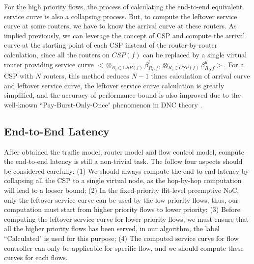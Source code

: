 \documentclass[10pt,journal]{IEEEtran}
\begin{document}
For the high priority flows, the process of calculating the end-to-end equivalent service curve is also a collapsing process. But, to compute the leftover service curve at some routers, we have to know the arrival curve at these routers. As implied previously, we can leverage the concept of CSP and compute the arrival curve at the starting point of each CSP instead of the router-by-router calculation, since all the routers on $CSP(f)$ can be replaced by a single virtual router providing service curve $<\otimes_{R_i\in CSP(f)}\beta_{R_i,f}^l,\otimes_{R_i\in CSP(f)}\beta_{R_i,f}^u>$. For a CSP with $N$ routers, this method reduces $N-1$ times calculation of arrival curve and leftover service curve, the leftover service curve calculation is greatly simplified, and the accuracy of performance bound is also improved due to the well-known ``Pay-Burst-Only-Once" phenomenon in DNC theory \cite{Boudec2001Network}.

\subsection{End-to-End Latency}
After obtained the traffic model, router model and flow control model, compute the end-to-end latency is still a non-trivial task. The follow four aspects should be considered carefully: (1) We should always compute the end-to-end latency by collapsing all the CSP to a single virtual node, as the hop-by-hop computation will lead to a looser bound; (2) In the fixed-priority flit-level preemptive NoC, only the leftover service curve can be used by the low priority flows, thus, our computation must start from higher priority flows to lower priority; (3) Before computing the leftover service curve for lower priority flows, we must ensure that all the higher priority flows has been served, in our algorithm, the label ``Calculated" is used for this purpose; (4) The computed service curve for flow controller can only be applicable for specific flow, and we should compute these curves for each flows.
\end{document}
